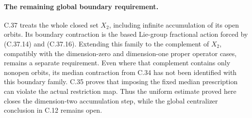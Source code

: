\paragraph{The remaining global boundary requirement.}
C.37 treats the whole closed set $X_2$, including infinite
accumulation of its open orbits. Its boundary contraction
is the based Lie-group fractional action forced by
(C.37.14) and (C.37.16). Extending this family to the
complement of $X_2$, compatibly with the dimension-zero
and dimension-one proper operator cases, remains a
separate requirement. Even where that complement
contains only nonopen orbits, its median contraction
from C.34 has not been identified with this boundary
family. C.35 proves that imposing the fixed median
prescription can violate the actual restriction map.
Thus the uniform estimate proved here closes the
dimension-two accumulation step, while the global
centralizer conclusion in C.12 remains open.
